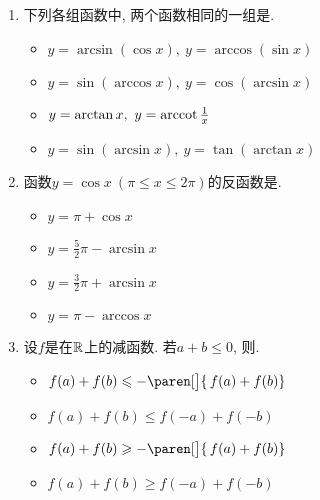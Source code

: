 \documentclass[a4paper,punct=CCT]{ctexbook}
\theoremstyle{break}
\newif\ifshowsol
\let\leq\leqslant
\let\le\leq
\let\geq\geqslant
\let\ge\geq}
\begin{document}
\begin{enumerate}
\item 下列各组函数中, 两个函数相同的一组是\uline{\makebox[6em]{}}.
  \begin{itemize}
    \renewcommand{\labelitemi}{\faCircleThin}
  \item \(y = \arcsin(\cos x),\ y = \arccos(\sin x)\)
    \ifshowsol
  \item[\faCircle] \(y = \sin(\arccos x),\ y = \cos(\arcsin x)\)
    \else
  \item \(y = \sin(\arccos x),\ y = \cos(\arcsin x)\)
    \fi
  \item \(y = \arctan x,\ y = \operatorname{arccot}\frac1x\)
  \item \(y = \sin(\arcsin x),\ y = \tan(\arctan x)\)
  \end{itemize}

  \ifshowsol
  选项C和D中的函数都是因为定义域的不同而导致函数不同的.
  \fi

\item 函数\(y = \cos x\ (\pi \le x \le 2\pi)\)的反函数是\uline{\makebox[6em]{}}.
  \begin{itemize}
    \renewcommand{\labelitemi}{\faCircleThin}
  \item \(y = \pi + \cos x\)
  \item \(y = \frac52\pi - \arcsin x\)
    \ifshowsol
  \item[\faCircle] \(y = \frac32\pi + \arcsin x\)
    \else
  \item \(y = \frac32\pi + \arcsin x\)
    \fi
  \item \(y = \pi - \arccos x\)
  \end{itemize}

\item 设\(f\)是在\(\mathbb{R}\)上的减函数.  若\(a + b \le 0\), 则\uline{\makebox[6em]{}}.
  \begin{itemize}
    \renewcommand{\labelitemi}{\faCircleThin}
  \item \(f(a) + f(b) \le -\paren[\big]{\,f(a) + f(b)}\)
  \item \(f(a) + f(b) \le f(-a) + f(-b)\)
  \item \(f(a) + f(b) \ge -\paren[\big]{\,f(a) + f(b)}\)
    \ifshowsol
  \item[\faCircle] \(f(a) + f(b) \ge f(-a) + f(-b)\)
    \else
  \item \(f(a) + f(b) \ge f(-a) + f(-b)\)
    \fi
  \end{itemize}

  \ifshowsol
  选项A和C都可以通过举反例来证伪, 比方说\(f(x) = \arccot x\)证伪了A, \(f(x) = -\pi + \arccot x\)证伪了C.  对于B和D, 可以根据\(a + b \le 0\)的性质来说明.  两个数的和非正, 这就说明至少其中有一个数非正.  当另外一个数也是非正的时候, 易证D成立.  当另外一个数是正数的时候, 不失一般地\,, 不妨假设\(a \le 0 < b\), 那么有\(a \le -b < 0 < b \le -a\). 所以有
  \[
    f(a) \ge f(-b) > f(b) \ge f(-a).
  \]
  因此D成立.
  \fi


\end{enumerate}
\end{document}
